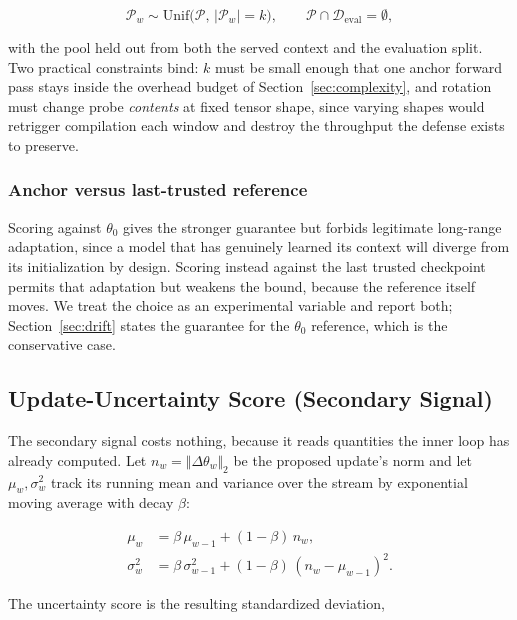 \documentclass[journal]{IEEEtran}
\newcommand{\anchorp}{\theta_{0}}
\newcommand{\dtheta}{\Delta\theta}
\begin{document}
\begin{equation}
\mathcal{P}_w \sim \mathrm{Unif}\big(\mathcal{P},\, |\mathcal{P}_w| = k\big),
\qquad
\mathcal{P} \cap \mathcal{D}_{\mathrm{eval}} = \emptyset,
\label{eq:rotation}
\end{equation}

with the pool held out from both the served context and the evaluation split. Two
practical constraints bind: $k$ must be small enough that one anchor forward pass
stays inside the overhead budget of Section~\ref{sec:complexity}, and rotation must
change probe \emph{contents} at fixed tensor shape, since varying shapes would
retrigger compilation each window and destroy the throughput the defense exists to
preserve.

\subsubsection{Anchor versus last-trusted reference}
Scoring against $\anchorp$ gives the stronger guarantee but forbids legitimate
long-range adaptation, since a model that has genuinely learned its context will
diverge from its initialization by design. Scoring instead against the last trusted
checkpoint permits that adaptation but weakens the bound, because the reference
itself moves. We treat the choice as an experimental variable and report both;
Section~\ref{sec:drift} states the guarantee for the $\anchorp$ reference, which is
the conservative case.

\subsection{Update-Uncertainty Score (Secondary Signal)}
\label{sec:uncertainty}

The secondary signal costs nothing, because it reads quantities the inner loop has
already computed. Let $n_w = \Vert \dtheta_w \Vert_{2}$ be the proposed update's
norm and let $\mu_w, \sigma_w^{2}$ track its running mean and variance over the
stream by exponential moving average with decay $\beta$:

\begin{align}
\mu_w &= \beta\,\mu_{w-1} + (1-\beta)\, n_w, \label{eq:ema1}\\
\sigma_w^{2} &= \beta\,\sigma_{w-1}^{2} + (1-\beta)\,(n_w - \mu_{w-1})^{2}.
\label{eq:ema2}
\end{align}

The uncertainty score is the resulting standardized deviation,
\end{document}
